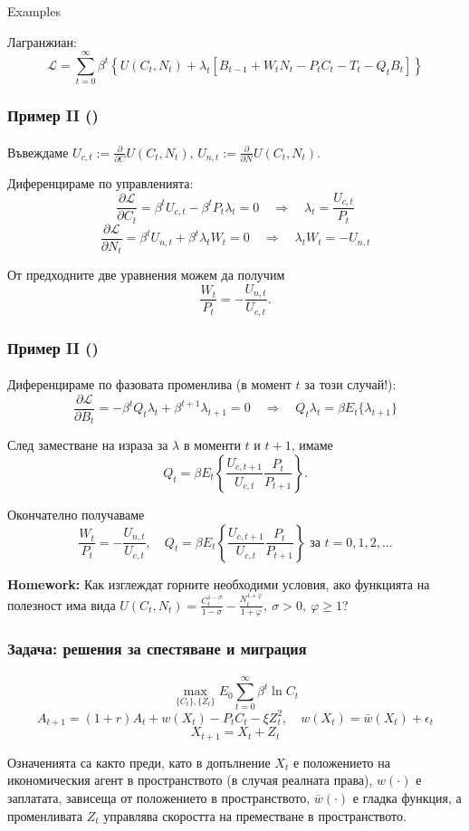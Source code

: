 \documentclass[10pt]{beamer}
\theoremstyle{definition}
\begin{document}
\begin{section}{Examples}
\begin{frame}
Лагранжиан:\[ \mathcal{L} = \sum_{t=0}^{\infty}\beta^t \left\{U(C_t,N_t)+\lambda_t \left[ B_{t-1} + W_t N_t - P_t C_t - T_t - Q_t B_t \right] \right\} \]
\end{frame}




\begin{frame}
\frametitle{Пример II ()}
\framesubtitle{}
Въвеждаме $ U_{c,t} := \frac{\partial}{\partial C}U(C_t,N_t)$, $ U_{n,t} := \frac{\partial}{\partial N}U(C_t,N_t)$.\bigskip

Диференцираме по управленията:
\[ \frac{\partial \mathcal{L} }{\partial C_t} = \beta^t U_{c,t} - \beta^t P_t \lambda_t = 0 \quad\Longrightarrow\quad \lambda_t = \frac{U_{c,t}}{P_t} \]
\[  \frac{\partial \mathcal{L} }{\partial N_t} = \beta^t U_{n,t}+\beta^t \lambda_t W_t =0 \quad\Longrightarrow\quad \lambda_t W_t = -U_{n,t}  \]\bigskip

От предходните две уравнения можем да получим \[ \frac{W_t}{P_t} = -\frac{U_{n,t}}{U_{c,t}}. \]
\end{frame}




\begin{frame}
\frametitle{Пример II ()}
\framesubtitle{}
Диференцираме по фазовата променлива (в момент $ t $ за този случай!):
\[ \frac{\partial \mathcal{L} }{\partial B_t} = -\beta^t Q_t \lambda_t + \beta^{t+1}\lambda_{t+1} = 0 \quad\Longrightarrow\quad Q_t \lambda_t = \beta E_t \{\lambda_{t+1}\} \]

След заместване на израза за $ \lambda $ в моменти $ t $ и $ t+1 $, имаме 
\[ Q_t = \beta E_t \left\{ \frac{U_{c,t+1}}{U_{c,t}}\frac{P_t}{P_{t+1}} \right\} .  \]

Окончателно получаваме \[ \frac{W_t}{P_t} = -\frac{U_{n,t}}{U_{c,t}}, \quad Q_t = \beta E_t \left\{ \frac{U_{c,t+1}}{U_{c,t}}\frac{P_t}{P_{t+1}} \right\} \text{ за } t=0,1,2,\ldots \]

\textbf{Homework:} Как изглеждат горните необходими условия, ако функцията на полезност има вида $ U(C_t,N_t)=\frac{C_t^{1-\sigma}}{1-\sigma}-\frac{N_t^{1+\varphi}}{1+\varphi},~\sigma>0,~\varphi \geq 1 $?
\end{frame}



\begin{frame}
\frametitle{Задача: решения за спестяване и миграция}
\framesubtitle{}
\[ \max_{\{C_t\},\{Z_t\}} E_0 \sum_{t=0}^{\infty}\beta^t \ln C_t  \]
\[ A_{t+1}=(1+r)A_t+w(X_t)-P_t C_t -\xi Z_t^2,\quad w(X_t) = \bar{w}(X_t)+\epsilon_t \]
\[ X_{t+1}  = X_t+Z_t \]

Означенията са както преди, като в допълнение $ X_t $ е положението на икономическия агент в пространството (в случая реалната права), $ w(\cdot) $ е заплатата, зависеща от положението в пространството, $ \bar{w}(\cdot) $ е гладка функция, а променливата $ Z_t $ управлява скоростта на преместване в пространството.
\end{frame}
\end{section}
\end{document}
